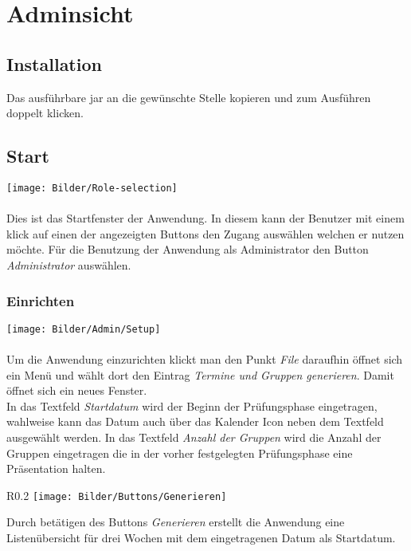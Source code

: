 \section{Adminsicht}

\subsection{Installation}
Das ausführbare jar an die gewünschte Stelle kopieren und zum Ausführen doppelt klicken.


\subsection{Start}
	\texttt{[image: Bilder/Role-selection]}
	\\
	\\
Dies ist das Startfenster der Anwendung. In diesem kann der Benutzer mit einem klick auf einen der angezeigten Buttons den Zugang auswählen welchen er nutzen möchte. Für die Benutzung der Anwendung als Administrator den Button \textit{Administrator} auswählen. 



\subsubsection{Einrichten}
	\texttt{[image: Bilder/Admin/Setup]}
	\\
	\\
Um die Anwendung einzurichten klickt man den Punkt \textit{File} daraufhin öffnet sich ein Menü und wählt dort den Eintrag \textit{Termine und Gruppen generieren}. Damit öffnet sich ein neues Fenster. \\In das Textfeld \textit{Startdatum} wird der Beginn der Prüfungsphase eingetragen, wahlweise kann das Datum auch über das Kalender Icon neben dem Textfeld ausgewählt werden. In das Textfeld \textit{Anzahl der Gruppen} wird die Anzahl der Gruppen eingetragen die in der vorher festgelegten Prüfungsphase eine Präsentation halten. 
\\
\begin{wrapfigure}{R}{0.2\textwidth}
	\centering
	\texttt{[image: Bilder/Buttons/Generieren]}
\end{wrapfigure}

Durch betätigen des Buttons \textit{Generieren} erstellt die Anwendung eine Listenübersicht für drei Wochen mit dem eingetragenen Datum als Startdatum.


